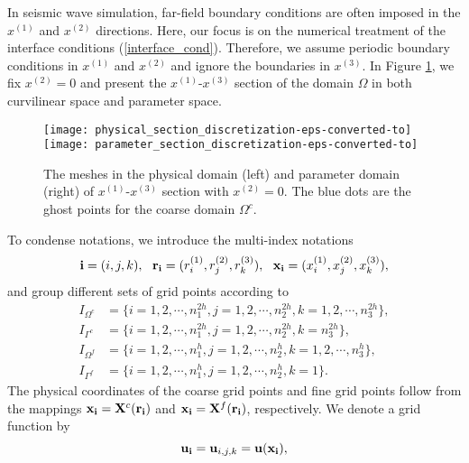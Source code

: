 In seismic wave simulation, far-field boundary conditions are often imposed in the $x^{(1)}$ and $x^{(2)}$ directions. Here, our focus is on the numerical treatment of the interface conditions (\ref{interface_cond}). Therefore, we assume periodic boundary conditions in $x^{(1)}$ and $x^{(2)}$ and ignore the boundaries in $x^{(3)}$. In Figure \ref{section_discretization}, we fix $x^{(2)} = 0$ and present the $x^{(1)}$-$x^{(3)}$ section of the domain $\Omega$ in both curvilinear space and parameter space.
\begin{figure}[htbp]
	\centering
	\texttt{[image: physical\_section\_discretization-eps-converted-to]}
	\texttt{[image: parameter\_section\_discretization-eps-converted-to]}
\caption{The meshes in the physical domain (left) and parameter domain (right) of $x^{(1)}$-$x^{(3)}$ section with $x^{(2)} = 0$. The blue dots are the ghost points for the coarse domain $\Omega^c$.}\label{section_discretization}
\end{figure}
 To condense notations, we introduce the multi-index notations
\[{\bf i} = (i,j,k),\ \ {\bf r}_{\bf i} = (r^{(1)}_i,r^{(2)}_j,r^{(3)}_k),\ \ {\bf x}_{\bf i} = (x^{(1)}_i,x^{(2)}_j,x^{(3)}_k),\]
and group different sets of grid points according to
\begin{equation*}
\begin{aligned}
	I_{\Omega^c} &= \{i = 1,2,\cdots,n_1^{2h}, j = 1,2,\cdots,n_2^{2h}, k = 1,2,\cdots,n_3^{2h}\},\\
	I_{\Gamma^c} & = \{i = 1,2,\cdots,n_1^{2h}, j = 1,2,\cdots,n_2^{2h}, k = n_3^{2h}\},\\
	I_{\Omega^f} &= \{i = 1,2,\cdots,n_1^h, j = 1,2,\cdots,n_2^h, k = 1,2,\cdots,n_3^h\},\\
	I_{\Gamma^f} & = \{i = 1,2,\cdots,n_1^{h}, j = 1,2,\cdots,n_2^{h}, k = 1\}.
\end{aligned}	
\end{equation*}
The physical coordinates of the coarse grid points and fine grid points follow from the mappings ${\bf x}_{\bf i} = {\bf X}^c({\bf r}_{\bf i})$ and ${\bf x}_{\bf i} = {\bf X}^f({\bf r}_{\bf i})$, respectively. We denote a grid function by
\[{\bf u}_{\bf i} = {\bf u}_{i,j,k} = {\bf u}({\bf x}_{\bf i}),\]
